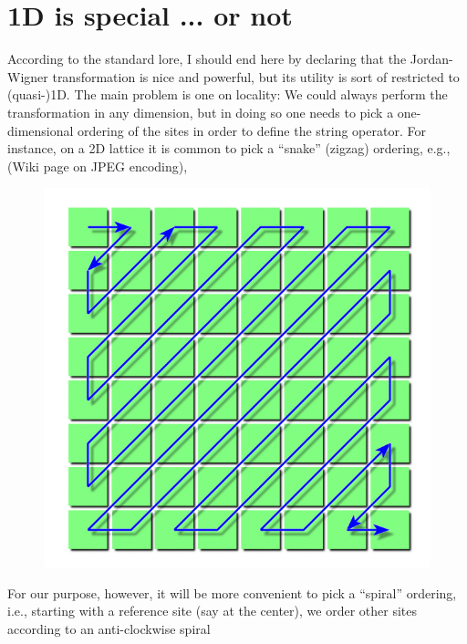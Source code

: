 \section{1D is special ... or not}

According to the standard lore, I should end here by declaring that the Jordan-Wigner transformation is nice and powerful, but its utility is sort of restricted to (quasi-)1D. The main problem is one on locality: We could always perform the transformation in any dimension, but in doing so one needs to pick a one-dimensional ordering of the sites in order to define the string operator. For instance, on a 2D lattice it is common to pick a ``snake'' (zigzag) ordering, e.g., (Wiki page on JPEG encoding),
\begin{figure}[H]
    \centering
    \includegraphics[width=\textwidth]{jupyterbook/data/fig/lec26-fig08.png}
\end{figure}
For our purpose, however, it will be more convenient to pick a ``spiral'' ordering, i.e., starting with a reference site (say at the center), we order other sites according to an anti-clockwise spiral
